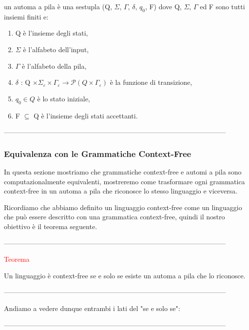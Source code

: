 \documentclass{article}
\begin{document}
un automa a pila è una sestupla (Q, $\Sigma$, $\Gamma$, $\delta$, $q_0$, F) dove
Q, $\Sigma$, $\Gamma$ ed F sono tutti insiemi finiti e:

\begin{enumerate}
    \item Q è l'insieme degli stati,
    \item $\Sigma$ è l'alfabeto dell'input,
    \item $\Gamma$ è l'alfabeto della pila,
    \item $\delta$ : Q $\times \Sigma_\varepsilon \times \Gamma_\varepsilon
    \rightarrow \mathcal{P} (Q \times \Gamma_\varepsilon)$ è la funzione di
    transizione,
    \item $q_0 \in Q$ è lo stato iniziale,
    \item F $\subseteq$ Q è l'insieme degli stati accettanti.
\end{enumerate}

--------------------------------------------------------------------------------------------------

\subsubsection{Equivalenza con le Grammatiche Context-Free}

In questa sezione mostriamo che grammatiche context-free e automi a pila sono
computazionalmente equivalenti, mostreremo come trasformare ogni grammatica
context-free in un automa a pila che riconosce lo stesso linguaggio e viceversa.

Ricordiamo che abbiamo definito un linguaggio context-free come un linguaggio
che può essere descritto con una grammatica context-free, quindi il nostro
obiettivo è il teorema seguente.

--------------------------------------------------------------------------------------------------

\begin{center}
    \textcolor{red}{Teorema}
\end{center}

Un linguaggio è context-free se e solo se esiste un automa a pila che lo
riconosce.

--------------------------------------------------------------------------------------------------

Andiamo a vedere dunque entrambi i lati del "se e solo se":

--------------------------------------------------------------------------------------------------
\end{document}
